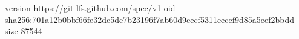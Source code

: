 version https://git-lfs.github.com/spec/v1
oid sha256:701a12b0bbf66fe32dc5de7b23196f7ab60d9cecf5311eecef9d85a5eef2bbdd
size 87544
